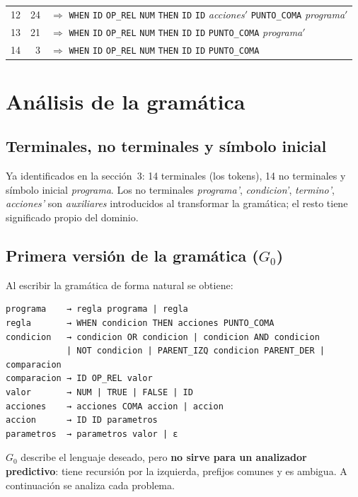 \begin{longtable}{@{}r r >{\raggedright\arraybackslash}p{12.2cm}@{}}
12 & 24 & $\Rightarrow$ \footnotesize \texttt{WHEN} \texttt{ID} \texttt{OP\_REL} \texttt{NUM} \texttt{THEN} \texttt{ID} \texttt{ID} \textit{acciones}$'$ \texttt{PUNTO\_COMA} \textit{programa}$'$ \\
13 & 21 & $\Rightarrow$ \footnotesize \texttt{WHEN} \texttt{ID} \texttt{OP\_REL} \texttt{NUM} \texttt{THEN} \texttt{ID} \texttt{ID} \texttt{PUNTO\_COMA} \textit{programa}$'$ \\
14 & 3 & $\Rightarrow$ \footnotesize \texttt{WHEN} \texttt{ID} \texttt{OP\_REL} \texttt{NUM} \texttt{THEN} \texttt{ID} \texttt{ID} \texttt{PUNTO\_COMA} \\
\bottomrule
\end{longtable}

\section{Análisis de la gramática}

\subsection{Terminales, no terminales y símbolo inicial}
Ya identificados en la sección~3: 14 terminales (los tokens), 14 no terminales y símbolo inicial \textit{programa}.
Los no terminales \textit{programa'}, \textit{condicion'}, \textit{termino'}, \textit{acciones'} son \emph{auxiliares}
introducidos al transformar la gramática; el resto tiene significado propio del dominio.

\subsection{Primera versión de la gramática ($G_0$)}
Al escribir la gramática de forma natural se obtiene:
\begin{lstlisting}[language={},numbers=none]
programa    → regla programa | regla
regla       → WHEN condicion THEN acciones PUNTO_COMA
condicion   → condicion OR condicion | condicion AND condicion
            | NOT condicion | PARENT_IZQ condicion PARENT_DER | comparacion
comparacion → ID OP_REL valor
valor       → NUM | TRUE | FALSE | ID
acciones    → acciones COMA accion | accion
accion      → ID ID parametros
parametros  → parametros valor | ε
\end{lstlisting}
$G_0$ describe el lenguaje deseado, pero \textbf{no sirve para un analizador predictivo}: tiene recursión por la
izquierda, prefijos comunes y es ambigua. A continuación se analiza cada problema.

